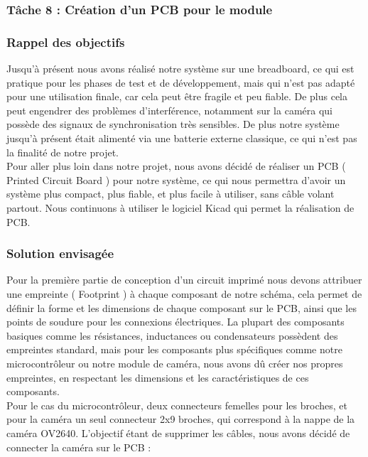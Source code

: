 \subsubsection{Tâche 8 : Création d'un PCB pour le module}

\subsubsection*{Rappel des objectifs}

Jusqu'à présent nous avons réalisé notre système sur une breadboard, ce qui est pratique pour les phases de test et de développement, mais qui n'est pas adapté pour une utilisation finale,
car cela peut être fragile et peu fiable. De plus cela peut engendrer des problèmes d'interférence, notamment sur la caméra qui possède des signaux de synchronisation très sensibles.
De plus notre système jusqu'à présent était alimenté via une batterie externe classique, ce qui n'est pas la finalité de notre projet.
\\

Pour aller plus loin dans notre projet, nous avons décidé de réaliser un PCB ( Printed Circuit Board ) pour notre système, ce qui nous permettra d'avoir un système plus compact, plus fiable, 
et plus facile à utiliser, sans câble volant partout. Nous continuons à utiliser le logiciel Kicad qui permet la réalisation de PCB.
\\

\subsubsection*{Solution envisagée}

Pour la première partie de conception d'un circuit imprimé nous devons attribuer une empreinte ( Footprint ) à chaque composant de notre schéma, cela permet de définir la forme et les dimensions 
de chaque composant sur le PCB, ainsi que les points de soudure pour les connexions électriques. La plupart des composants basiques comme les résistances,
inductances ou condensateurs possèdent des empreintes standard, mais pour les composants plus spécifiques comme notre microcontrôleur ou notre module de caméra, nous avons dû créer nos propres empreintes, 
en respectant les dimensions et les caractéristiques de ces composants.
\\

Pour le cas du microcontrôleur, deux connecteurs femelles pour les broches, et pour la caméra un seul connecteur 2x9 broches, qui correspond à la nappe de la caméra OV2640.
L'objectif étant de supprimer les câbles, nous avons décidé de connecter la caméra sur le PCB : 
\\

